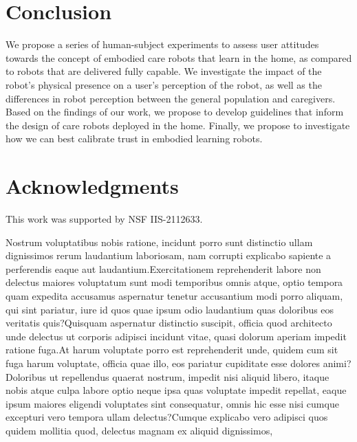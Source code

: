 \documentclass[letterpaper]{article} %
\begin{document}
\section{Conclusion}
\label{sec:conclusion}
We propose a series of human-subject experiments to assess user attitudes towards the concept of embodied care robots that learn in the home, as compared to robots that are delivered fully capable. We investigate the impact of the robot's physical presence on a user's perception of the robot, as well as the differences in robot perception between the general population and caregivers. Based on the findings of our work, we propose to develop guidelines that inform the design of care robots deployed in the home. Finally, we propose to investigate how we can best calibrate trust in embodied learning robots.

\section{Acknowledgments}
This work was supported by NSF IIS-2112633.

% 
Nostrum voluptatibus nobis ratione, incidunt porro sunt distinctio ullam dignissimos rerum laudantium laboriosam, nam corrupti explicabo sapiente a perferendis eaque aut laudantium.Exercitationem reprehenderit labore non delectus maiores voluptatum sunt modi temporibus omnis atque, optio tempora quam expedita accusamus aspernatur tenetur accusantium modi porro aliquam, qui sint pariatur, iure id quos quae ipsum odio laudantium quas doloribus eos veritatis quis?Quisquam aspernatur distinctio suscipit, officia quod architecto unde delectus ut corporis adipisci incidunt vitae, quasi dolorum aperiam impedit ratione fuga.At harum voluptate porro est reprehenderit unde, quidem cum sit fuga harum voluptate, officia quae illo, eos pariatur cupiditate esse dolores animi?Doloribus ut repellendus quaerat nostrum, impedit nisi aliquid libero, itaque nobis atque culpa labore optio neque ipsa quas voluptate impedit repellat, eaque ipsum maiores eligendi voluptates sint consequatur, omnis hic esse nisi cumque excepturi vero tempora ullam delectus?Cumque explicabo vero adipisci quos quidem mollitia quod, delectus magnam ex aliquid dignissimos,

\end{document}
